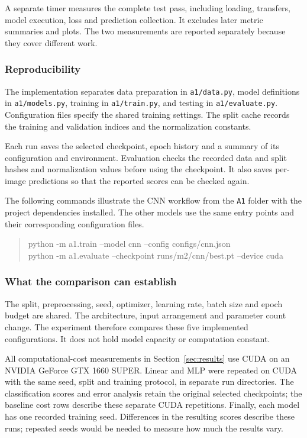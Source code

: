 A separate timer measures the complete test pass, including loading, transfers,
model execution, loss and prediction collection. It excludes later metric
summaries and plots. The two measurements are reported separately because they
cover different work.

\subsubsection{Reproducibility}
The implementation separates data preparation in \texttt{a1/data.py}, model
definitions in \texttt{a1/models.py}, training in \texttt{a1/train.py}, and testing
in \texttt{a1/evaluate.py}. Configuration files specify the shared training
settings. The split cache records the training and validation indices and the
normalization constants.

Each run saves the selected checkpoint, epoch history and a summary of its
configuration and environment. Evaluation checks the recorded data and split
hashes and normalization values before using the checkpoint. It also saves
per-image predictions so that the reported scores can be checked again.

The following commands illustrate the CNN workflow from the \texttt{A1} folder
with the project dependencies installed. The other models use the same entry
points and their corresponding configuration files.
\begin{quote}\small\ttfamily
python -m a1.train --model cnn --config configs/cnn.json\\
python -m a1.evaluate --checkpoint runs/m2/cnn/best.pt --device cuda
\end{quote}

\subsubsection{What the comparison can establish}
The split, preprocessing, seed, optimizer, learning rate, batch size and epoch
budget are shared. The architecture, input arrangement and parameter count
change. The experiment therefore compares these five implemented configurations.
It does not hold model capacity or computation constant.

All computational-cost measurements in Section~\ref{sec:results} use CUDA on
an NVIDIA GeForce GTX 1660 SUPER. Linear and MLP were repeated on CUDA with
the same seed, split and training protocol, in separate run directories.
The classification scores and error analysis retain the original selected
checkpoints; the baseline cost rows describe these separate CUDA repetitions.
Finally, each model has one recorded
training seed. Differences in the resulting scores describe these runs; repeated
seeds would be needed to measure how much the results vary.

